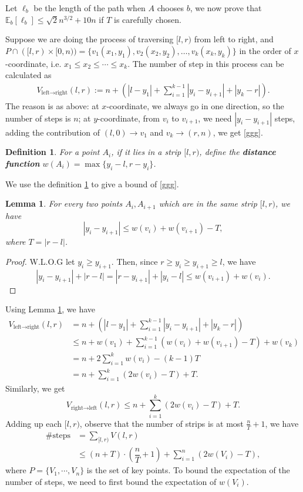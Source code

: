 \documentclass[11pt]{article}
\theoremstyle{plain}
\newtheorem{lemma}{Lemma}[section]
\newtheorem{definition}{Definition}[section]
\begin{document}
Let $\ell_b$ be the length of the path when $A$ chooses $b$, we now prove that $\mathbb{E}_b[\ell_b]\le \sqrt{2}n^{3/2}+10n$ if $T$ is carefully chosen.

Suppose we are doing the process of traversing $[l,r)$ from left to right, and $P\cap ([l,r)\times [0,n))=\{v_1(x_1,y_1),v_2(x_2,y_2),\ldots,v_k(x_k,y_k)\}$ in the order of $x$-coordinate, i.e. $x_1\le x_2\le \cdots\le x_k$. The number of step in this process can be calculated as
\begin{align}
V_{\text{left}\to \text{right}}(l,r):=n+\left(|l-y_1|+\sum\limits_{i=1}^{k-1} |y_{i}-y_{i+1}|+|y_k-r|\right). \label{ggg}
\end{align}
The reason is as above: at $x$-coordinate, we always go in one direction, so the number of steps is $n$; at $y$-coordinate, from $v_i$ to $v_{i+1}$, we need $|y_i-y_{i+1}|$ steps, adding the contribution of $(l,0)\to v_1$ and $v_k\to (r,n)$, we get \eqref{ggg}.

\begin{definition}
\label{def5.3}
For a point $A_i$, if it lies in a strip $[l,r)$, define the \textbf{distance function} $w(A_i)=\max\{y_i-l,r-y_i\}$.
\end{definition}
We use the definition \ref{def5.3} to give a bound of \eqref{ggg}.

\begin{lemma}
    \label{ineq}
For every two points $A_i,A_{i+1}$ which are in the same strip $[l,r)$, we have
$$|y_i-y_{i+1}|\le w(v_i)+w(v_{i+1})-T,$$
where $T=|r-l|$.
\end{lemma}
\begin{proof}
W.L.O.G let $y_i\ge y_{i+1}$. Then, since $r\ge y_i\ge y_{i+1}\ge l$, we have
$$|y_i-y_{i+1}|+|r-l|=|r-y_{i+1}|+|y_i-l|\le w(v_{i+1})+w(v_i).$$
\end{proof}

Using Lemma \ref{ineq}, we have
\begin{align*}
V_{\text{left}\to \text{right}}(l,r) &= n+\left(|l-y_1|+\sum\limits_{i=1}^{k-1} |y_{i}-y_{i+1}|+|y_k-r|\right)\\
&\le n + w(v_1) + \sum\limits_{i=1}^{k-1} (w(v_i)+w(v_{i+1})-T) + w(v_k)\\
&= n + 2\sum\limits_{i=1}^{k} w(v_i) - (k-1)T\\
&= n + \sum\limits_{i=1}^k (2w(v_i)-T) + T. 
\end{align*}
Similarly, we get
$$V_{\text{right}\to \text{left}}(l,r)\le n + \sum\limits_{i=1}^k (2w(v_i)-T) + T. $$
Adding up each $[l,r)$, observe that the number of strips is at most $\frac{n}{T}+1$, we have
\begin{align*}
\#\text{steps} &= \sum\limits_{[l,r)} V(l,r)\\
&\le (n+T)\cdot \left(\dfrac{n}{T}+1\right)+\sum\limits_{i=1}^n (2w(V_i)-T),
\end{align*}
where $P=\{V_1,\cdots,V_n\}$ is the set of key points. To bound the expectation of the number of steps, we need to first bound the expectation of $w(V_i)$.
\end{document}
